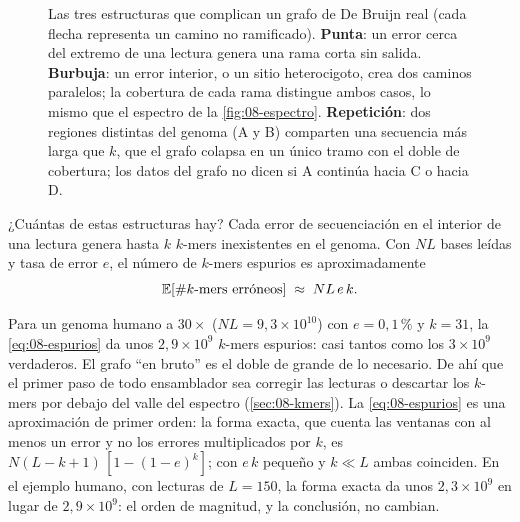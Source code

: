 \begin{figure}[t]
\caption[Defectos típicos de un grafo de De Bruijn]{Las tres estructuras que complican un grafo de De Bruijn real (cada flecha representa un camino no ramificado). \textbf{Punta}: un error cerca del extremo de una lectura genera una rama corta sin salida. \textbf{Burbuja}: un error interior, o un sitio heterocigoto, crea dos caminos paralelos; la cobertura de cada rama distingue ambos casos, lo mismo que el espectro de la \cref{fig:08-espectro}. \textbf{Repetición}: dos regiones distintas del genoma (A y B) comparten una secuencia más larga que $k$, que el grafo colapsa en un único tramo con el doble de cobertura; los datos del grafo no dicen si A continúa hacia C o hacia D.}
\label{fig:08-defectos}
\end{figure}

¿Cuántas de estas estructuras hay? Cada error de secuenciación en el interior de una lectura genera hasta $k$ $k$-mers inexistentes en el genoma. Con $NL$ bases leídas y tasa de error $e$, el número de $k$-mers espurios es aproximadamente
\begin{equation}\label{eq:08-espurios}
\mathbb{E}[\#\text{$k$-mers erróneos}] \;\approx\; N L\, e\, k .
\end{equation}

\begin{simbolos}
\end{simbolos}

Para un genoma humano a $30\times$ ($NL=9{,}3\times10^{10}$) con $e=0{,}1\,\%$ y $k=31$, la \cref{eq:08-espurios} da unos $2{,}9\times10^{9}$ $k$-mers espurios: casi tantos como los $3\times10^9$ verdaderos. El grafo ``en bruto'' es el doble de grande de lo necesario. De ahí que el primer paso de todo ensamblador sea corregir las lecturas o descartar los $k$-mers por debajo del valle del espectro (\cref{sec:08-kmers}). La \cref{eq:08-espurios} es una aproximación de primer orden: la forma exacta, que cuenta las ventanas con al menos un error y no los errores multiplicados por $k$, es $N(L-k+1)\,[1-(1-e)^k]$; con $e\,k$ pequeño y $k\ll L$ ambas coinciden. En el ejemplo humano, con lecturas de $L=150$, la forma exacta da unos $2{,}3\times10^{9}$ en lugar de $2{,}9\times10^{9}$: el orden de magnitud, y la conclusión, no cambian.

